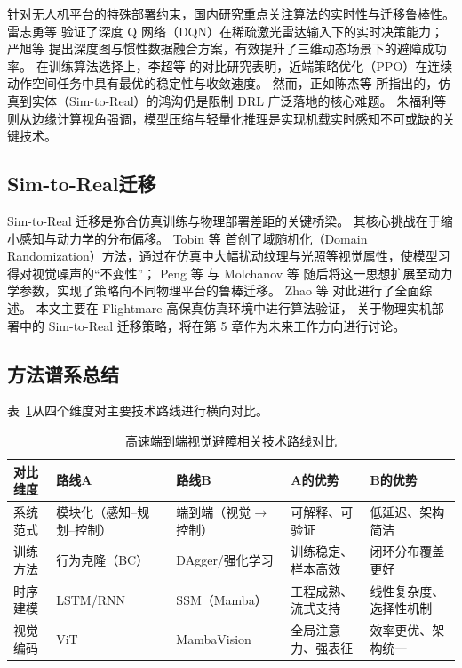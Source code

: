 针对无人机平台的特殊部署约束，国内研究重点关注算法的实时性与迁移鲁棒性。
雷志勇等\cite{Lei2020DRLAvoidance} 验证了深度 Q 网络（DQN）在稀疏激光雷达输入下的实时决策能力；
严旭等\cite{Yan2021DRLObstacle} 提出深度图与惯性数据融合方案，有效提升了三维动态场景下的避障成功率。
在训练算法选择上，李超等\cite{Li2022RLUAV} 的对比研究表明，近端策略优化（PPO）在连续动作空间任务中具有最优的稳定性与收敛速度。
然而，正如陈杰等\cite{Chen2023DRLDroneReview} 所指出的，仿真到实体（Sim-to-Real）的鸿沟仍是限制 DRL 广泛落地的核心难题。
朱福利等\cite{Zhu2021DeepLearningUAV} 则从边缘计算视角强调，模型压缩与轻量化推理是实现机载实时感知不可或缺的关键技术。

\subsection{Sim-to-Real迁移}

Sim-to-Real 迁移是弥合仿真训练与物理部署差距的关键桥梁。
其核心挑战在于缩小感知与动力学的分布偏移。
Tobin 等\cite{Tobin2017DomainRandomization} 首创了域随机化（Domain Randomization）方法，通过在仿真中大幅扰动纹理与光照等视觉属性，使模型习得对视觉噪声的“不变性”；
Peng 等\cite{Peng2018SimtoRealRL} 与 Molchanov 等\cite{Molchanov2019SimRL} 随后将这一思想扩展至动力学参数，实现了策略向不同物理平台的鲁棒迁移。
Zhao 等\cite{Zhao2020SimtoReal} 对此进行了全面综述。
本文主要在 Flightmare 高保真仿真环境中进行算法验证，
关于物理实机部署中的 Sim-to-Real 迁移策略，将在第 5 章作为未来工作方向进行讨论。

\subsection{方法谱系总结}

表~\ref{tab:route_compare}从四个维度对主要技术路线进行横向对比。

\begin{table}[htbp]
\centering
\caption{高速端到端视觉避障相关技术路线对比}
\label{tab:route_compare}
\begin{tabular}{p{1.5cm}p{2.8cm}p{2.8cm}p{2.5cm}p{2.5cm}}
\toprule
\textbf{对比维度} & \textbf{路线A} & \textbf{路线B} & \textbf{A的优势} & \textbf{B的优势} \\
\midrule
系统范式 &
模块化（感知--规划--控制） &
端到端（视觉$\to$控制） &
可解释、可验证 &
低延迟、架构简洁 \\
\midrule
训练方法 &
行为克隆（BC） &
DAgger/强化学习 &
训练稳定、样本高效 &
闭环分布覆盖更好 \\
\midrule
时序建模 &
LSTM/RNN &
SSM（Mamba） &
工程成熟、流式支持 &
线性复杂度、选择性机制 \\
\midrule
视觉编码 &
ViT &
MambaVision &
全局注意力、强表征 &
效率更优、架构统一 \\
\bottomrule
\end{tabular}
\end{table}


